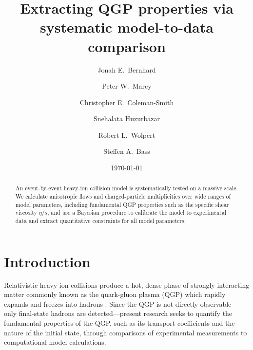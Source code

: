 \documentclass[aps,prc,reprint,superscriptaddress,amsmath]{revtex4-1}
\begin{document}
\title{Extracting QGP properties via systematic model-to-data comparison}

\author{Jonah E.\ Bernhard}

\author{Peter W.\ Marcy}

\author{Christopher E.\ Coleman-Smith}

\author{Snehalata Huzurbazar}

\author{Robert L.\ Wolpert}

\author{Steffen A.\ Bass}

\date{\today}

\begin{abstract}
  An event-by-event heavy-ion collision model is systematically tested on a massive scale.
  We calculate anisotropic flows and charged-particle multiplicities over wide ranges of model parameters, including fundamental QGP properties such as the specific shear viscosity $\eta/s$, and use a Bayesian procedure to calibrate the model to experimental data and extract quantitative constraints for all model parameters.
\end{abstract}

\maketitle


\section{Introduction}

Relativistic heavy-ion collisions produce a hot, dense phase of strongly-interacting matter commonly known as the quark-gluon plasma (QGP) which rapidly expands and freezes into hadrons \cite{Arsene:2004fa,Adcox:2004mh,Back:2004je,Adams:2005dq,Gyulassy:2004zy,Muller:2006ee,Muller:2012zq}.
Since the QGP is not directly observable---only final-state hadrons are detected---present research seeks to quantify the fundamental properties of the QGP, such as its transport coefficients and the nature of the initial state, through comparisons of experimental measurements to computational model calculations.
\end{document}
